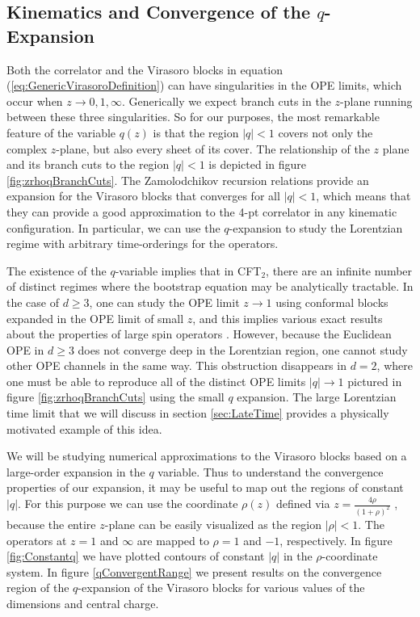 \subsection{Kinematics and Convergence of the $q$-Expansion}
\label{sec:Kinematicsandq}

Both the correlator and the Virasoro blocks in equation (\ref{eq:GenericVirasoroDefinition}) can have singularities in the OPE limits, which occur when $z \to 0, 1, \infty$.  Generically we expect branch cuts in the $z$-plane running between these three singularities.  So for our purposes, the most remarkable feature of the variable $q(z)$ is that the region $|q| < 1$ covers not only the complex $z$-plane, but also every sheet of its cover. The relationship of the $z$ plane and its branch cuts to the region $|q| < 1$  \cite{Maldacena:2015iua} is depicted in figure \ref{fig:zrhoqBranchCuts}.  The Zamolodchikov recursion relations provide an expansion for the Virasoro blocks that converges for all $|q| < 1$, which means that they can provide a good approximation to the 4-pt correlator in any kinematic configuration.  In particular, we can use the $q$-expansion to study the Lorentzian regime with arbitrary time-orderings for the operators.

The existence of the $q$-variable implies that in CFT$_2$, there are an infinite number of distinct regimes where the bootstrap equation may be analytically tractable.  In the case of $d \geq 3$, one can study the OPE limit $z \to 1$ using conformal blocks expanded in the OPE limit of small $z$, and this implies various exact results about the properties of large spin operators \cite{Fitzpatrick:2012yx, KomargodskiZhiboedov, Alday:2016njk}.  However, because the Euclidean OPE in $d \geq 3$ does not converge deep in the Lorentzian region, one cannot study other OPE channels in the same way.  This obstruction disappears in $d =2$, where one must be able to reproduce all of the distinct OPE limits $|q| \to 1$ pictured in figure \ref{fig:zrhoqBranchCuts} using the small $q$ expansion.   The large Lorentzian time limit that we will discuss in section \ref{sec:LateTime} provides a physically motivated example of this idea.

We will be studying numerical approximations to the Virasoro blocks based on a large-order expansion in the $q$ variable.  Thus to understand the convergence properties of our expansion, it may be useful to map out the regions of constant $|q|$.  For this purpose we can use the coordinate $\rho(z)$ defined via $z = \frac{4 \rho}{(1+\rho)^2}$ \cite{Pappadopulo:2012jk}, because the entire $z$-plane can be easily visualized as the region $|\rho| < 1$.  The operators at $z= 1$ and $\infty$ are mapped to $\rho = 1$ and  $-1$, respectively.  In figure \ref{fig:Constantq} we have plotted contours of constant $|q|$ in the $\rho$-coordinate system.  In figure \ref{qConvergentRange} we present results on the convergence region of the $q$-expansion of the Virasoro blocks for various values of the dimensions and central charge.

